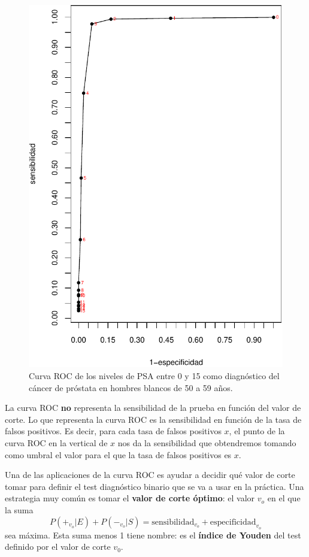 \documentclass[
]{book}
\theoremstyle{definition}
\theoremstyle{definition}
\theoremstyle{definition}
\theoremstyle{definition}
\theoremstyle{remark}
\begin{document}
\begin{figure}

{\centering \includegraphics[width=0.75\linewidth]{INREMDN_files/figure-latex/ROCama1-1} 

}

\caption{Curva ROC de los niveles de PSA entre 0 y 15 como diagnóstico del cáncer de próstata en hombres blancos de 50 a 59 años.}\label{fig:ROCama1}
\end{figure}

\begin{rmdimportant}
La curva ROC \textbf{no} representa la sensibilidad de la prueba en función del valor de corte. Lo que representa la curva ROC es la sensibilidad en función de la tasa de falsos positivos. Es decir, para cada tasa de falsos positivos \(x\), el punto de la curva ROC en la vertical de \(x\) nos da la sensibilidad que obtendremos tomando como umbral el valor para el que la tasa de falsos positivos es \(x\).
\end{rmdimportant}

Una de las aplicaciones de la curva ROC es ayudar a decidir qué valor de corte tomar para definir el test diagnóstico binario que se va a usar en la práctica. Una estrategia muy común es tomar el \textbf{valor de corte óptimo}: el valor \(v_o\) en el que la suma
\[
P(+_{v_o}|E)+P(-_{v_o}|S)=\text{sensibilidad}_{v_o}+\text{especificidad}_{v_o}
\]
sea máxima. Esta suma menos 1 tiene nombre: es el \textbf{índice de Youden} del test definido por el valor de corte \(v_0\).
\end{document}
